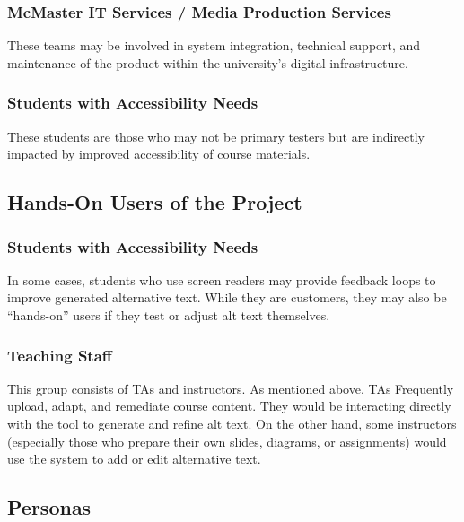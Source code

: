 \documentclass[12pt]{article}
\begin{document}
\subsubsection {McMaster IT Services / Media Production Services}
These teams may be involved in system integration, technical support,
and maintenance of the product within the university’s digital infrastructure.
\subsubsection {Students with Accessibility Needs}
These students are those who may not be primary testers but are
indirectly impacted
by improved accessibility of course materials.
\subsection{Hands-On Users of the Project}
\subsubsection{Students with Accessibility Needs}
In some cases, students who use screen readers may provide feedback
loops to improve generated alternative text. While they are customers, they
may also be “hands-on” users if they test or adjust alt text themselves.
\subsubsection{Teaching Staff}
This group consists of TAs and instructors. As mentioned above, TAs
Frequently upload, adapt, and remediate course content. They would be
interacting directly with the tool to generate and refine alt text.
On the other hand, some instructors (especially those who prepare
their own slides, diagrams, or assignments) would use the system to
add or edit alternative text.
\subsection{Personas}
\end{document}
